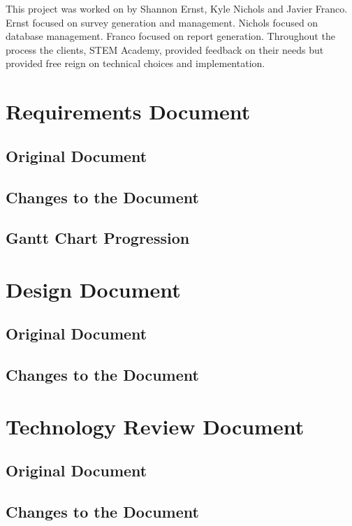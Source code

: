 \documentclass[letterpaper,10pt,serif,draftclsnofoot,onecolumn,compsoc,titlepage]{IEEEtran}
\begin{document}
This project was worked on by Shannon Ernst, Kyle Nichols and Javier Franco.
Ernst focused on survey generation and management. 
Nichols focused on database management.
Franco focused on report generation.
Throughout the process the clients, STEM Academy, provided feedback on their needs but provided free reign on technical choices and implementation. \\

\section{Requirements Document}
\subsection{Original Document}

%

\subsection{Changes to the Document}
\subsection{Gantt Chart Progression}

\section{Design Document}
\subsection{Original Document}

\subsection{Changes to the Document}

\section{Technology Review Document}
\subsection{Original Document}

\subsection{Changes to the Document}
\end{document}
